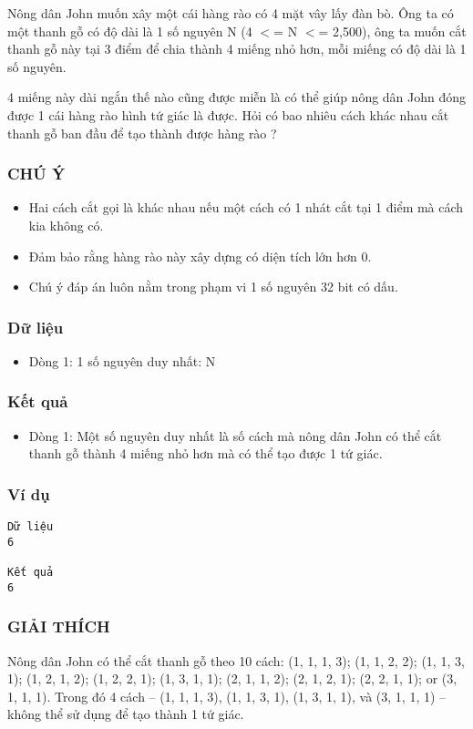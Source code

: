 



   Nông dân John muốn xây một cái hàng rào có 4 mặt vây lấy đàn bò. Ông ta có một thanh gỗ có độ dài là 1 số nguyên N (4 $<$= N $<$= 2,500), ông ta muốn cắt thanh gỗ này tại 3 điểm để chia thành 4 miếng nhỏ  hơn, mỗi miếng có độ dài là 1 số nguyên.  

   4 miếng này dài ngắn thế nào cũng được miễn là có thể giúp nông dân John đóng được 1 cái hàng rào hình tứ giác là được. Hỏi có bao nhiêu cách khác nhau cắt thanh gỗ ban đầu để tạo thành được hàng rào ?  

\subsubsection{   CHÚ Ý  }
\begin{itemize}
	\item     Hai cách cắt gọi là khác nhau nếu một cách có 1 nhát cắt tại 1     điểm mà cách kia không có.   
	\item     Đảm bảo rằng hàng rào này xây dựng có diện tích lớn hơn 0.   
	\item     Chú ý đáp án luôn nằm trong phạm vi 1 số nguyên 32 bit có dấu.   
\end{itemize}

\subsubsection{   Dữ liệu  }
\begin{itemize}
	\item     Dòng 1: 1 số nguyên duy nhất: N   
\end{itemize}

\subsubsection{   Kết quả  }
\begin{itemize}
	\item     Dòng 1: Một số nguyên duy nhất là số cách mà nông dân John         có thể cắt thanh gỗ thành 4 miếng nhỏ hơn mà có thể tạo được 1 tứ giác.   
\end{itemize}

\subsubsection{   Ví dụ  }
\begin{verbatim}
Dữ liệu
6

Kết quả
6
\end{verbatim}

\subsubsection{   GIẢI THÍCH  }

   Nông dân John có thể cắt thanh gỗ theo 10 cách: (1, 1, 1, 3); (1, 1, 2, 2); (1, 1, 3, 1); (1, 2, 1, 2); (1, 2, 2, 1); (1, 3, 1, 1); (2, 1, 1, 2); (2, 1, 2, 1); (2, 2, 1, 1); or (3, 1, 1, 1). Trong đó 4 cách -- (1, 1, 1, 3), (1, 1, 3, 1), (1, 3, 1, 1), và (3, 1, 1, 1) -- không thể sử dụng để tạo thành 1 tứ giác.  